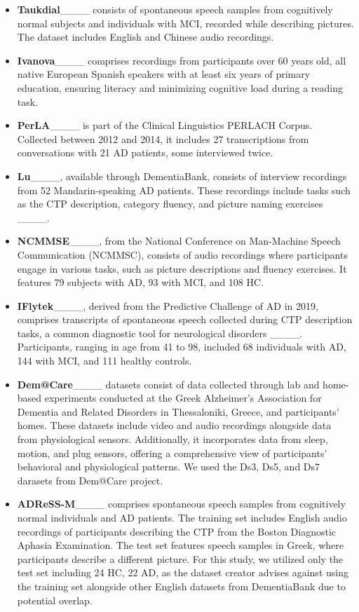 \begin{itemize}
    \item \textbf{Taukdial}____ consists of spontaneous speech samples from cognitively normal subjects and individuals with MCI, recorded while describing pictures. The dataset includes English and Chinese audio recordings.
    \item \textbf{Ivanova}____ comprises recordings from participants over 60 years old, all native European Spanish speakers with at least six years of primary education, ensuring literacy and minimizing cognitive load during a reading task. 
    \item \textbf{PerLA}____ is part of the Clinical Linguistics PERLACH Corpus. %
    Collected between 2012 and 2014, it includes 27 transcriptions from conversations with 21 AD patients, some interviewed twice.
    \item \textbf{Lu}____, available through DementiaBank, consists of interview recordings from 52 Mandarin-speaking AD patients. These recordings include tasks such as the CTP description, category fluency, and picture naming exercises ____.
    \item \textbf{NCMMSE}____, from the National Conference on Man-Machine Speech Communication (NCMMSC), consists of audio recordings where participants engage in various tasks, such as picture descriptions and fluency exercises. It features 79 subjects with AD, 93 with MCI, and 108 HC. %
    \item \textbf{IFlytek}____, derived from the Predictive Challenge of AD in 2019, comprises transcripts of spontaneous speech collected during CTP description tasks, a common diagnostic tool for neurological disorders ____. Participants, ranging in age from 41 to 98, included 68 individuals with AD, 144 with MCI, and 111 healthy controls.
    \item \textbf{Dem@Care}____ datasets consist of data collected through lab and home-based experiments conducted at the Greek Alzheimer’s Association for Dementia and Related Disorders in Thessaloniki, Greece, and participants' homes. These datasets include video and audio recordings alongside data from physiological sensors. Additionally, it incorporates data from sleep, motion, and plug sensors, offering a comprehensive view of participants' behavioral and physiological patterns. We used the Ds3, Ds5, and Ds7 darasets from Dem@Care project.
    \item \textbf{ADReSS-M}____ comprises spontaneous speech samples from cognitively normal individuals and AD patients. The training set includes English audio recordings of participants describing the CTP from the Boston Diagnostic Aphasia Examination. The test set features speech samples in Greek, where participants describe a different picture. For this study, we utilized only the test set including 24 HC, 22 AD, as the dataset creator advises against using the training set alongside other English datasets from DementiaBank due to potential overlap.
\end{itemize}


